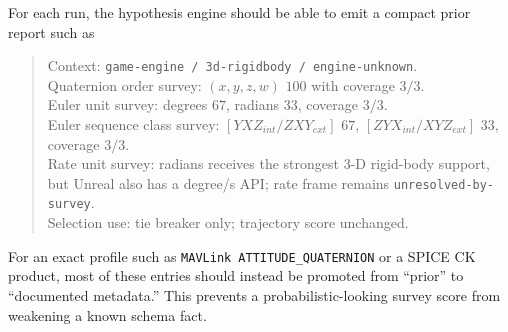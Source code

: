 \documentclass[11pt]{article}
\begin{document}
    For each run, the hypothesis engine should be able to emit a compact prior report such as
    \begin{quote}
        \small
        Context: \texttt{game-engine / 3d-rigidbody / engine-unknown}.\\
        Quaternion order survey: $(x,y,z,w)$ $100$ with coverage $3/3$.\\
        Euler unit survey: degrees $67$, radians $33$, coverage $3/3$.\\
        Euler sequence class survey: $[YXZ_{int}/ZXY_{ext}]$ $67$,
        $[ZYX_{int}/XYZ_{ext}]$ $33$, coverage $3/3$.\\
        Rate unit survey: radians receives the strongest 3-D rigid-body support, but Unreal also
        has a degree/s API; rate frame remains \texttt{unresolved-by-survey}.\\
        Selection use: tie breaker only; trajectory score unchanged.
    \end{quote}
    For an exact profile such as \texttt{MAVLink ATTITUDE\_QUATERNION} or a SPICE CK product,
    most of these entries should instead be promoted from ``prior'' to ``documented
    metadata.'' This prevents a probabilistic-looking survey score from weakening a known
    schema fact.
\end{document}
